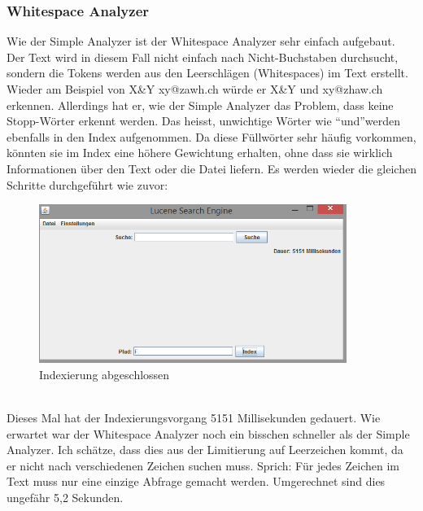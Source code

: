 \documentclass[12pt,a4paper,ngerman]{report}
\begin{document}
\subsubsection{Whitespace Analyzer}
Wie der Simple Analyzer ist der Whitespace Analyzer sehr einfach aufgebaut. Der Text wird in diesem Fall nicht einfach nach Nicht-Buchstaben durchsucht, sondern die Tokens werden aus den Leerschlägen (Whitespaces) im Text erstellt. Wieder am Beispiel von X\&Y xy@zawh.ch würde er X\&Y und xy@zhaw.ch erkennen. Allerdings hat er, wie der Simple Analyzer das Problem, dass keine Stopp-Wörter erkennt werden. Das heisst, unwichtige Wörter wie \textquotedblleft und\textquotedblright werden ebenfalls in den Index aufgenommen. Da diese Füllwörter sehr häufig vorkommen, könnten sie im Index eine höhere Gewichtung erhalten, ohne dass sie wirklich Informationen über den Text oder die Datei liefern.
\newpage
Es werden wieder die gleichen Schritte durchgeführt wie zuvor:
\begin{figure}[h!]
\centering
\includegraphics[width=10cm]{img/whitespace-analyzer-index.png}
\caption{Indexierung abgeschlossen\protect\footnotemark}
\end{figure}
\\
Dieses Mal hat der Indexierungsvorgang 5151 Millisekunden gedauert. Wie erwartet war der Whitespace Analyzer noch ein bisschen schneller als der Simple Analyzer. Ich schätze, dass dies aus der Limitierung auf Leerzeichen kommt, da er nicht nach verschiedenen Zeichen suchen muss. Sprich: Für jedes Zeichen im Text muss nur eine einzige Abfrage gemacht werden. Umgerechnet sind dies ungefähr 5,2 Sekunden.
\end{document}

